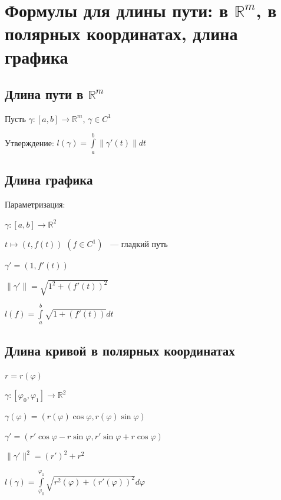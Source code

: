 \documentclass{article}
\begin{document}
    \newpage
    
    \section{Формулы для длины пути: в $\mathbb{R}^m$, в полярных координатах, длина графика}
    
        \subsection{Длина пути в $\mathbb{R}^m$}
            Пусть $\gamma: [a, b] \rightarrow \mathbb{R}^m$, $\gamma \in C^1$
        
            Утверждение: $l(\gamma) = \int\limits^b_a \| \gamma'(t) \| dt$
        
        \subsection{Длина графика}
        
            Параметризация:
            
            $\gamma: [a, b] \rightarrow \mathbb{R}^2$
            
            $t \mapsto (t, f(t))$ $(f \in C^1)$ ~--- гладкий путь
            
            $\gamma' = (1, f'(t))$
            
            $\| \gamma' \| = \sqrt{1^2 + (f'(t))^2}$
            
            $l(f) = \int\limits^b_a \sqrt{1 + (f'(t))} dt$
            
        \subsection{Длина кривой в полярных координатах}
        
            $r = r(\varphi)$
            
            $\gamma: [\varphi_0, \varphi_1] \rightarrow \mathbb{R}^2$
            
            $\gamma(\varphi) = (r(\varphi) \cos{\varphi}, r(\varphi) \sin{\varphi})$
            
            $\gamma' = (r'\cos{\varphi} - r\sin{\varphi}, r'\sin{\varphi} + r \cos{\varphi})$
            
            $\| \gamma' \|^2 = (r')^2 + r^2$
            
            $l(\gamma) = \int\limits^{\varphi_1}_{\varphi_0} \sqrt{r^2(\varphi) + (r'(\varphi))^2} d\varphi$
            
\end{document}
